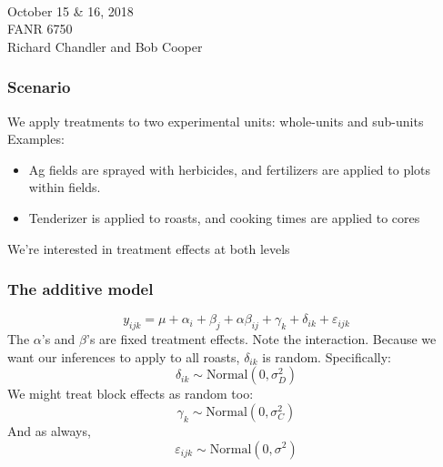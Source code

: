 \documentclass[color=usenames,dvipsnames]{beamer}\usepackage[]{graphicx}\usepackage[]{color}
\begin{document}
\begin{frame}[plain]
  \huge
  \centering \par
  {\color{RoyalBlue}{Lab 9 -- Split-plot Designs}} \\
  \vspace{1cm}
  \Large
  October 15 \& 16, 2018 \\
  FANR 6750 \\
  \vfill
  \large
  Richard Chandler and Bob Cooper
\end{frame}










\begin{frame}
  \frametitle{Scenario}
  \large
  We apply treatments to two experimental units: whole-units and
  sub-units
  \pause
  \vfill
  Examples:
  \begin{itemize}
    \large
    \item Ag fields are sprayed with herbicides, and fertilizers
      are applied to plots within fields.
    \item Tenderizer is applied to roasts, and cooking times are
      applied to cores
  \end{itemize}
  \pause
  \vfill
  We're interested in treatment effects at both levels
\end{frame}






\begin{frame}
  \frametitle{The additive model}
\[
y_{ijk} = \mu + \alpha_i + \beta_{j} + \alpha\beta_{ij} + \gamma_k +
\delta_{ik} + \varepsilon_{ijk}
\] %
The $\alpha$'s and $\beta$'s are fixed treatment effects. Note the interaction.
\pause
\vfill
Because we want our inferences to apply to all roasts,
$\delta_{ik}$ is random. Specifically:
\[
\delta_{ik} \sim \mbox{Normal}(0, \sigma^2_D)
\]
We might treat block effects as random too:
\[
\gamma_k \sim \mbox{Normal}(0, \sigma^2_C)
\]
\large
And as always,
\[
\varepsilon_{ijk} \sim \mbox{Normal}(0, \sigma^2)
\]
\end{frame}
\end{document}
